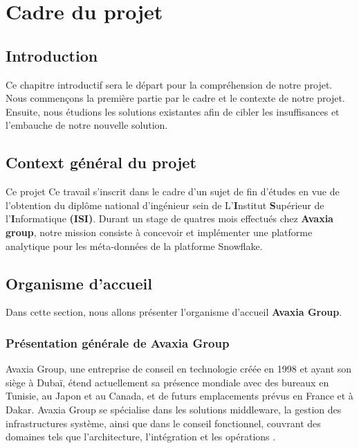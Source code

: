 \chapter{Cadre du projet}
\section*{Introduction}
\par {\huge C}e chapitre introductif sera le départ pour la compréhension de notre projet. 
Nous commençons la première partie par le cadre et le contexte de notre projet. 
Ensuite, nous étudions les solutions existantes afin de cibler les insuffisances et l'embauche de notre nouvelle solution.

\section{Context général du projet}
\par Ce projet Ce travail s'inscrit dans le cadre d'un sujet de fin d'études en vue de l'obtention du diplôme national d'ingénieur sein de L'\textbf{I}nstitut \textbf{S}upérieur de l'\textbf{I}nformatique \textbf{(ISI)}.
 Durant un stage de quatres mois effectués chez \textbf{Avaxia group}, notre mission consiste à concevoir et implémenter une platforme analytique pour les méta-données de la platforme Snowflake.
\section[Organisme d'accueil]{Organisme d'accueil}
\par Dans cette section, nous allons présenter l'organisme d'accueil \textbf{Avaxia Group}. 
\subsection{Présentation générale de Avaxia Group}

\par Avaxia Group, une entreprise de conseil en technologie créée en 1998 et ayant son siège à Dubaï, étend actuellement sa présence mondiale avec des bureaux  en Tunisie, au Japon et au Canada, et de futurs emplacements prévus en France et à Dakar. 
Avaxia Group se spécialise dans les solutions middleware, la gestion des infrastructures système, ainsi que dans le conseil fonctionnel, couvrant des domaines tels que l'architecture, l'intégration et les opérations \cite{avaxia}.
